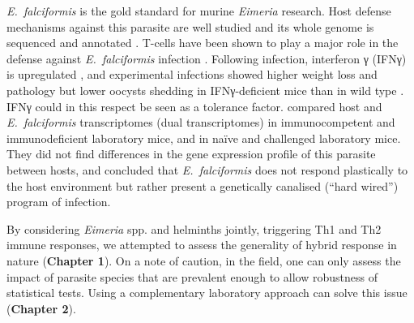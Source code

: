 \textit{E.~falciformis} is the gold standard for murine \textit{Eimeria} research. Host defense mechanisms against this parasite are well studied \parencite[see for example][]{mesfin_pathological_1978, pogonka_cd8_2010, schmid_apicomplexan_2012} and its whole genome is sequenced and annotated \citep{heitlinger_genome_2014}. T-cells have been shown to play a major role in the defense against \textit{E.~falciformis} infection \citep{mesfin_thymic_1979, stiff_effect_1990}. Following infection, interferon γ (IFNγ) is upregulated \citep{schmid_eimeria_2014}, and experimental infections showed higher weight loss and pathology but lower oocysts shedding in IFNγ-deficient mice than in wild type \citep{stange_il-22_2012}. IFNγ could in this respect be seen as a tolerance factor. \cite{ehret_dual_2017} compared host and \textit{E.~falciformis} transcriptomes (dual transcriptomes) in immunocompetent and immunodeficient laboratory mice, and in naïve and challenged laboratory mice. They did not find differences in the gene expression profile of this parasite between hosts, and concluded that \textit{E.~falciformis} does not respond plastically to the host environment but rather present a genetically canalised (“hard wired”) program of infection. 
\par
By considering \textit{Eimeria} spp. and helminths jointly, triggering Th1 and Th2 immune responses, we attempted to assess the generality of hybrid response in nature (\textbf{Chapter 1}). On a note of caution, in the field, one can only assess the impact of parasite species that are prevalent enough to allow robustness of statistical tests. Using a complementary laboratory approach can solve this issue (\textbf{Chapter 2}).
